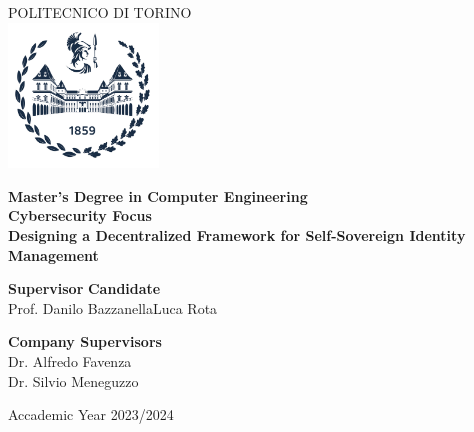 \begin{titlepage}


  \begin{center}

    {\huge POLITECNICO DI TORINO}\\[1cm]

    \includegraphics[width=0.3\textwidth]{./Images/logo_polito_2021.jpg}

    \textbf{\large Master’s Degree in Computer Engineering\\Cybersecurity Focus}\\[3cm]


    \textbf{\huge Designing a Decentralized Framework for Self-Sovereign Identity Management }\\[2cm]

    \vspace{3.5cm}

    \begin{minipage}{0.85\textwidth}

      \begin{flushleft}\large
        \textbf{Supervisor} \hfill \textbf{Candidate}\\
        Prof. Danilo Bazzanella\hfill Luca Rota\\
      \end{flushleft}

      \begin{flushleft}\large
        \textbf{Company Supervisors} \\
        Dr. Alfredo Favenza\\
        Dr. Silvio Meneguzzo\\
      \end{flushleft}

    \end{minipage}

    \vfill

    Accademic Year 2023/2024
  \end{center}

  \restoregeometry

\end{titlepage}